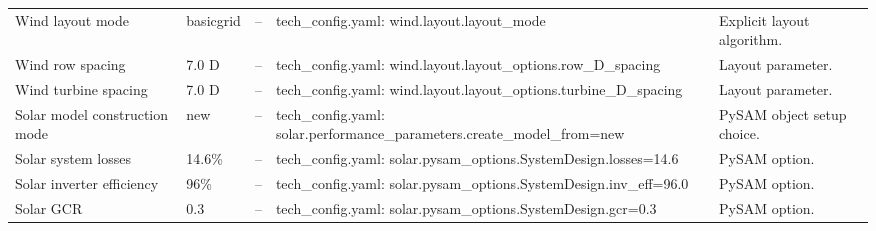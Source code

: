 \begin{center}
\begin{tabular}{L{0.16\textwidth} L{0.14\textwidth} L{0.22\textwidth} L{0.22\textwidth} L{0.20\textwidth}}
Wind layout mode & basicgrid & -- & tech\_config.yaml: wind.layout.layout\_mode & Explicit layout algorithm. \\
Wind row spacing & 7.0 D & -- & tech\_config.yaml: wind.layout.layout\_options.row\_D\_spacing & Layout parameter. \\
Wind turbine spacing & 7.0 D & -- & tech\_config.yaml: wind.layout.layout\_options.turbine\_D\_spacing & Layout parameter. \\
Solar model construction mode & new & -- & tech\_config.yaml: solar.performance\_parameters.create\_model\_from=new & PySAM object setup choice. \\
Solar system losses & 14.6\% & -- & tech\_config.yaml: solar.pysam\_options.SystemDesign.losses=14.6 & PySAM option. \\
Solar inverter efficiency & 96\% & -- & tech\_config.yaml: solar.pysam\_options.SystemDesign.inv\_eff=96.0 & PySAM option. \\
Solar GCR & 0.3 & -- & tech\_config.yaml: solar.pysam\_options.SystemDesign.gcr=0.3 & PySAM option. \\

\hline
\end{tabular}
\end{center}

\newpage

